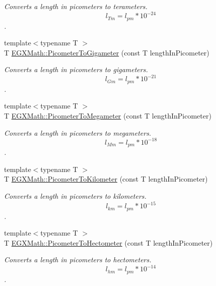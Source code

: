 \begin{DoxyCompactItemize}
\begin{DoxyCompactList}\small\item\em Converts a length in picometers to terameters. \[ l_{Tm}=l_{pm} * 10^{-24} \]. \end{DoxyCompactList}\item 
{\footnotesize template$<$typename T $>$ }\\T \mbox{\hyperlink{group___e_g_x_math-_conversions-_length_conversions-_s_i-_picometer-_s_i_ga9dbf38a2c9eb2f88b4e5061861ec42de}{E\+G\+X\+Math\+::\+Picometer\+To\+Gigameter}} (const T length\+In\+Picometer)
\begin{DoxyCompactList}\small\item\em Converts a length in picometers to gigameters. \[ l_{Gm}=l_{pm} * 10^{-21} \]. \end{DoxyCompactList}\item 
{\footnotesize template$<$typename T $>$ }\\T \mbox{\hyperlink{group___e_g_x_math-_conversions-_length_conversions-_s_i-_picometer-_s_i_gacf6647b0c2ac985376601d5095fa1624}{E\+G\+X\+Math\+::\+Picometer\+To\+Megameter}} (const T length\+In\+Picometer)
\begin{DoxyCompactList}\small\item\em Converts a length in picometers to megameters. \[ l_{Mm}=l_{pm} * 10^{-18} \]. \end{DoxyCompactList}\item 
{\footnotesize template$<$typename T $>$ }\\T \mbox{\hyperlink{group___e_g_x_math-_conversions-_length_conversions-_s_i-_picometer-_s_i_ga8a1f5000b027dfc9980738a0565c773e}{E\+G\+X\+Math\+::\+Picometer\+To\+Kilometer}} (const T length\+In\+Picometer)
\begin{DoxyCompactList}\small\item\em Converts a length in picometers to kilometers. \[ l_{km}=l_{pm} * 10^{-15} \]. \end{DoxyCompactList}\item 
{\footnotesize template$<$typename T $>$ }\\T \mbox{\hyperlink{group___e_g_x_math-_conversions-_length_conversions-_s_i-_picometer-_s_i_ga51eebefd8810385585aa33ca80ac6e93}{E\+G\+X\+Math\+::\+Picometer\+To\+Hectometer}} (const T length\+In\+Picometer)
\begin{DoxyCompactList}\small\item\em Converts a length in picometers to hectometers. \[ l_{hm}=l_{pm} * 10^{-14} \]. \end{DoxyCompactList}\item 

\end{DoxyCompactItemize}

